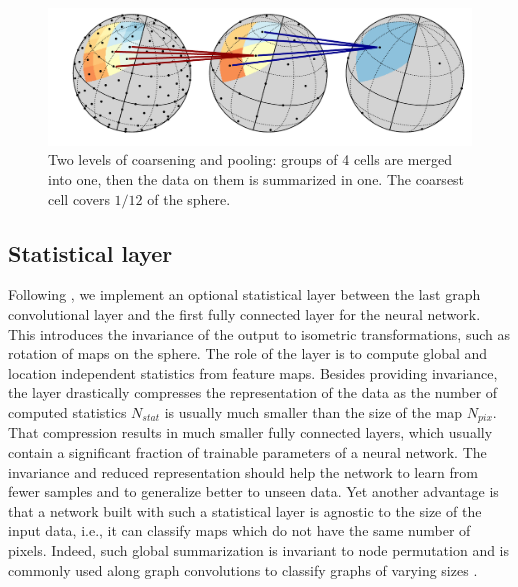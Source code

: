 \documentclass[final,twocolumn,3p,times,authoryear]{elsarticle}
\newcommand{\1}{\b{1}}              %
\newcommand{\0}{\b{0}}              %
\begin{document}

\begin{figure}
	\centering
	\includegraphics[trim=1.1cm 0cm 0cm 0cm, width=\linewidth]{figures/figure_pooling_svg.pdf}
	\caption{Two levels of coarsening and pooling: groups of 4 cells are merged into one, then the data on them is summarized in one. The coarsest cell covers $1/12$ of the sphere.}
	\label{fig:pooling}
\end{figure}

\subsection{Statistical layer}
\label{sec:stat_layer}

Following \citet{khasanova2017tigranet}, we implement an optional statistical layer between the last graph convolutional layer and the first fully connected layer for the neural network.
This introduces the invariance of the output to isometric transformations, such as rotation of maps on the sphere.
The role of the layer is to compute global and location independent statistics from feature maps.
Besides providing invariance, the layer drastically compresses the representation of the data as the number of computed statistics $N_{stat}$ is usually much smaller than the size of the map $N_{pix}$. That compression results in much smaller fully connected layers, which usually contain a significant fraction of trainable parameters of a neural network.
The invariance and reduced representation should help the network to learn from fewer samples and to generalize better to unseen data. Yet another advantage is that a network built with such a statistical layer is agnostic to the size of the input data, i.e., it can classify maps which do not have the same number of pixels. Indeed, such global summarization is invariant to node permutation and is commonly used along graph convolutions to classify graphs of varying sizes \citep{duvenaud2015gcn, li2015gatedgnn}.
\end{document}
